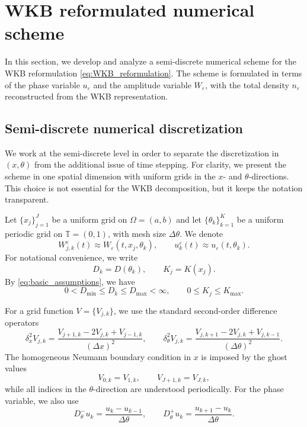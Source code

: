 \documentclass[11pt]{article}
\begin{document}
\section{WKB reformulated numerical scheme}\label{sec:WKB_scheme}

In this section, we develop and analyze a semi-discrete numerical scheme for
the WKB reformulation \eqref{eq:WKB_reformulation}. The scheme is formulated
in terms of the phase variable \(u_\varepsilon\) and the amplitude variable
\(W_\varepsilon\), with the total density \(n_\varepsilon\) reconstructed from
the WKB representation.

\subsection{Semi-discrete numerical discretization}

We work at the semi-discrete level in order to separate the discretization in
\((x,\theta)\) from the additional issue of time stepping. For clarity, we
present the scheme in one spatial dimension with uniform grids in the
\(x\)- and \(\theta\)-directions. This choice is not essential for the WKB
decomposition, but it keeps the notation transparent.

Let \(\{x_j\}_{j=1}^J\) be a uniform grid on \(\Omega=(a,b)\) and let
\(\{\theta_k\}_{k=1}^K\) be a uniform periodic grid on \(\mathbb T=(0,1)\),
with mesh size \(\Delta\theta\). We denote
\[
W_{j,k}^\varepsilon(t)\approx W_\varepsilon(t,x_j,\theta_k),
\qquad
u_k^\varepsilon(t)\approx u_\varepsilon(t,\theta_k).
\]
For notational convenience, we write
\[
D_k=D(\theta_k),
\qquad
K_j=K(x_j).
\]
By \eqref{eq:basic_assumptions}, we have 
\[
    0<D_{\min}\le D_k\le D_{\max}<\infty,
    \qquad
    0\le K_j\le K_{\max}.
\]


For a grid function \(V=\{V_{j,k}\}\), we use the standard second-order
difference operators
\[
\delta_x^2 V_{j,k}
=
\frac{V_{j+1,k}-2V_{j,k}+V_{j-1,k}}{(\Delta x)^2},
\qquad
\delta_\theta^2 V_{j,k}
=
\frac{V_{j,k+1}-2V_{j,k}+V_{j,k-1}}{(\Delta\theta)^2}.
\]
The homogeneous Neumann boundary condition in \(x\) is imposed by the ghost
values
\[
V_{0,k}=V_{1,k},
\qquad
V_{J+1,k}=V_{J,k},
\]
while all indices in the \(\theta\)-direction are understood periodically.
For the phase variable, we also use
\[
D_\theta^-u_k
=
\frac{u_k-u_{k-1}}{\Delta\theta},
\qquad
D_\theta^+u_k
=
\frac{u_{k+1}-u_k}{\Delta\theta}.
\]
\end{document}
